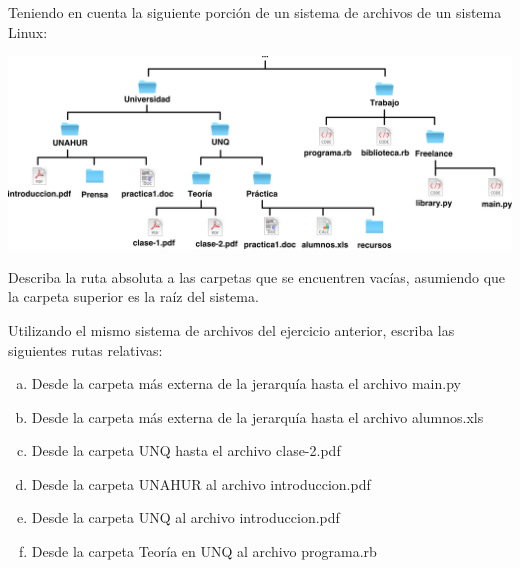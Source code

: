 \begin{exercise}
Teniendo en cuenta la siguiente porción de un sistema de archivos de un
sistema Linux:

\centerline{\includegraphics[scale=0.4]{capitulos/informatica/imagenes/directorios_relativos.png}}

Describa la ruta absoluta a las carpetas que se encuentren vacías, asumiendo que la
carpeta superior es la raíz del sistema.
\end{exercise}

\begin{exercise}
Utilizando el mismo sistema de archivos del ejercicio anterior, escriba
las siguientes rutas relativas:
\begin{enumerate}[a)]
    \item Desde la carpeta más externa de la jerarquía hasta el archivo
        main.py
    \item Desde la carpeta más externa de la jerarquía hasta el archivo
        alumnos.xls
    \item Desde la carpeta UNQ hasta el archivo clase-2.pdf
    \item Desde la carpeta UNAHUR al archivo introduccion.pdf
    \item Desde la carpeta UNQ al archivo introduccion.pdf
    \item Desde la carpeta Teoría en UNQ al archivo programa.rb
\end{enumerate}
\end{exercise}


